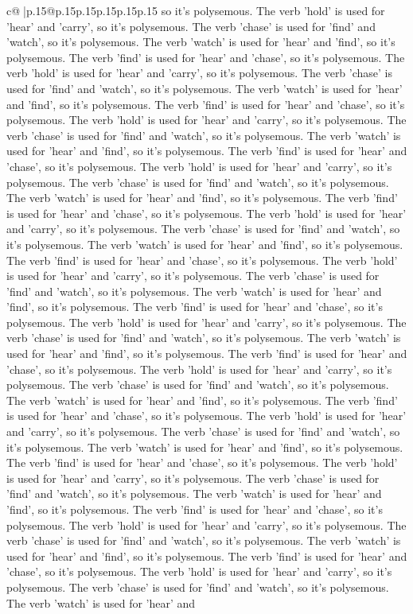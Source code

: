 \documentclass{article}
\begin{document}
{\begin{supertabular}{c@{$\;$}|p{.15\linewidth}@{}p{.15\linewidth}p{.15\linewidth}p{.15\linewidth}p{.15\linewidth}p{.15\linewidth}}
{{{so it's polysemous. The verb 'hold' is used for 'hear' and 'carry', so it's polysemous. The verb 'chase' is used for 'find' and 'watch', so it's polysemous. The verb 'watch' is used for 'hear' and 'find', so it's polysemous. The verb 'find' is used for 'hear' and 'chase', so it's polysemous. The verb 'hold' is used for 'hear' and 'carry', so it's polysemous. The verb 'chase' is used for 'find' and 'watch', so it's polysemous. The verb 'watch' is used for 'hear' and 'find', so it's polysemous. The verb 'find' is used for 'hear' and 'chase', so it's polysemous. The verb 'hold' is used for 'hear' and 'carry', so it's polysemous. The verb 'chase' is used for 'find' and 'watch', so it's polysemous. The verb 'watch' is used for 'hear' and 'find', so it's polysemous. The verb 'find' is used for 'hear' and 'chase', so it's polysemous. The verb 'hold' is used for 'hear' and 'carry', so it's polysemous. The verb 'chase' is used for 'find' and 'watch', so it's polysemous. The verb 'watch' is used for 'hear' and 'find', so it's polysemous. The verb 'find' is used for 'hear' and 'chase', so it's polysemous. The verb 'hold' is used for 'hear' and 'carry', so it's polysemous. The verb 'chase' is used for 'find' and 'watch', so it's polysemous. The verb 'watch' is used for 'hear' and 'find', so it's polysemous. The verb 'find' is used for 'hear' and 'chase', so it's polysemous. The verb 'hold' is used for 'hear' and 'carry', so it's polysemous. The verb 'chase' is used for 'find' and 'watch', so it's polysemous. The verb 'watch' is used for 'hear' and 'find', so it's polysemous. The verb 'find' is used for 'hear' and 'chase', so it's polysemous. The verb 'hold' is used for 'hear' and 'carry', so it's polysemous. The verb 'chase' is used for 'find' and 'watch', so it's polysemous. The verb 'watch' is used for 'hear' and 'find', so it's polysemous. The verb 'find' is used for 'hear' and 'chase', so it's polysemous. The verb 'hold' is used for 'hear' and 'carry', so it's polysemous. The verb 'chase' is used for 'find' and 'watch', so it's polysemous. The verb 'watch' is used for 'hear' and 'find', so it's polysemous. The verb 'find' is used for 'hear' and 'chase', so it's polysemous. The verb 'hold' is used for 'hear' and 'carry', so it's polysemous. The verb 'chase' is used for 'find' and 'watch', so it's polysemous. The verb 'watch' is used for 'hear' and 'find', so it's polysemous. The verb 'find' is used for 'hear' and 'chase', so it's polysemous. The verb 'hold' is used for 'hear' and 'carry', so it's polysemous. The verb 'chase' is used for 'find' and 'watch', so it's polysemous. The verb 'watch' is used for 'hear' and 'find', so it's polysemous. The verb 'find' is used for 'hear' and 'chase', so it's polysemous. The verb 'hold' is used for 'hear' and 'carry', so it's polysemous. The verb 'chase' is used for 'find' and 'watch', so it's polysemous. The verb 'watch' is used for 'hear' and 'find', so it's polysemous. The verb 'find' is used for 'hear' and 'chase', so it's polysemous. The verb 'hold' is used for 'hear' and 'carry', so it's polysemous. The verb 'chase' is used for 'find' and 'watch', so it's polysemous. The verb 'watch' is used for 'hear' and }}}
\end{supertabular}}
\end{document}
